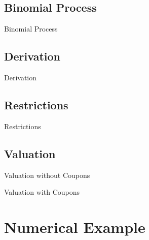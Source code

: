 \documentclass{beamer}
\begin{document}

\subsection{Binomial Process}

\begin{frame}{Binomial Process}

\end{frame}


\subsection{Derivation}

\begin{frame}{Derivation}

\end{frame}


\subsection{Restrictions}

\begin{frame}{Restrictions}

\end{frame}


\subsection{Valuation}

\begin{frame}{Valuation without Coupons}

\end{frame}

\begin{frame}{Valuation with Coupons}

\end{frame}



\section{Numerical Example}
\end{document}
